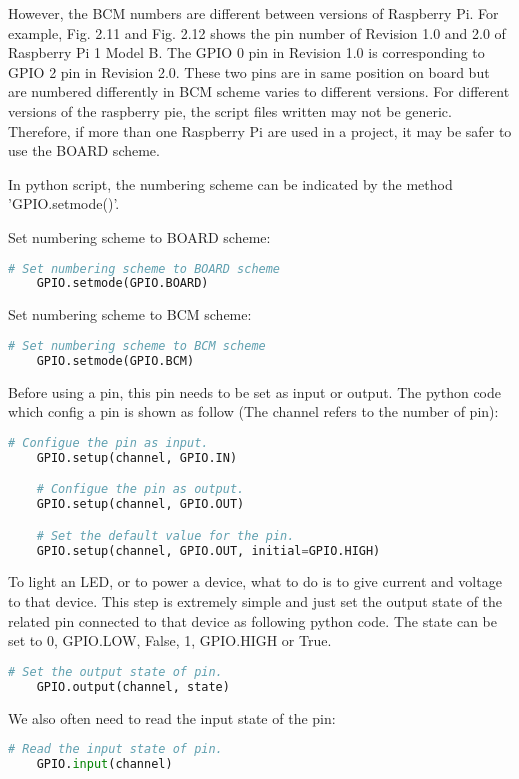\documentclass[11pt,times,oneside,openright,hardcopy]{eeereport}
\begin{document}
However, the BCM numbers are different between versions of Raspberry Pi. For example, Fig. 2.11 and Fig. 2.12 shows the pin number of Revision 1.0 and 2.0 of Raspberry Pi 1 Model B. The GPIO 0 pin in Revision 1.0 is corresponding to GPIO 2 pin in Revision 2.0. 
These two pins are in same position on board but are numbered differently in BCM scheme varies to different versions.
For different versions of the raspberry pie, the script files written may not be generic.
Therefore, if more than one Raspberry Pi are used in a project, it may be safer to use the BOARD scheme.

In python script, the numbering scheme can be indicated by the method 'GPIO.setmode()'.

Set numbering scheme to BOARD scheme:
\begin{lstlisting}[language=Python]
    # Set numbering scheme to BOARD scheme
    GPIO.setmode(GPIO.BOARD)
\end{lstlisting}

Set numbering scheme to BCM scheme:
\begin{lstlisting}[language=Python]
    # Set numbering scheme to BCM scheme
    GPIO.setmode(GPIO.BCM)
\end{lstlisting}

Before using a pin, this pin needs to be set as input or output. The python code which config a pin is shown as follow (The channel refers to the number of pin):
\begin{lstlisting}[language=Python]
    # Configue the pin as input.
    GPIO.setup(channel, GPIO.IN)

    # Configue the pin as output.
    GPIO.setup(channel, GPIO.OUT)

    # Set the default value for the pin.
    GPIO.setup(channel, GPIO.OUT, initial=GPIO.HIGH)
\end{lstlisting}

To light an LED, or to power a device, what to do is to give current and voltage to that device. 
This step is extremely simple and just set the output state of the related pin connected to that device as following python code.
The state can be set to 0, GPIO.LOW, False, 1, GPIO.HIGH or True.
\begin{lstlisting}[language=Python]
    # Set the output state of pin.
    GPIO.output(channel, state)
\end{lstlisting}
We also often need to read the input state of the pin:
\begin{lstlisting}[language=Python]
    # Read the input state of pin.
    GPIO.input(channel)
\end{lstlisting}
\end{document}
